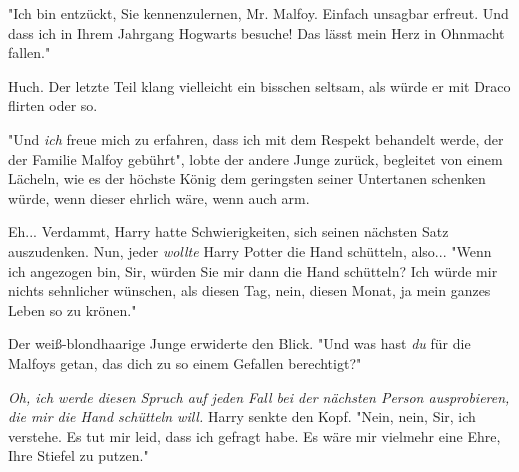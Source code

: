 "Ich bin entzückt, Sie kennenzulernen, Mr. Malfoy. Einfach unsagbar erfreut. Und dass ich in Ihrem Jahrgang Hogwarts besuche! Das lässt mein Herz in Ohnmacht fallen."

Huch. Der letzte Teil klang vielleicht ein bisschen seltsam, als würde er mit Draco flirten oder so. 

"Und \emph{ich} freue mich zu erfahren, dass ich mit dem Respekt behandelt werde, der der Familie Malfoy gebührt",
lobte der andere Junge zurück, begleitet von einem Lächeln, wie es der höchste König dem geringsten seiner Untertanen schenken würde, wenn dieser ehrlich wäre, wenn auch arm. 

Eh... Verdammt, Harry hatte Schwierigkeiten, sich seinen nächsten Satz auszudenken. Nun, jeder \emph{wollte} Harry Potter die Hand schütteln, also... "Wenn ich angezogen bin, Sir, würden Sie mir dann die Hand schütteln? Ich würde mir nichts sehnlicher wünschen, als diesen Tag, nein, diesen Monat, ja mein ganzes Leben so zu krönen." 

Der weiß-blondhaarige Junge erwiderte den Blick. "Und was hast \emph{du} für die Malfoys getan, das dich zu so einem Gefallen berechtigt?"

\emph{Oh, ich werde diesen Spruch auf jeden Fall bei der nächsten Person ausprobieren, die mir die Hand schütteln will.} Harry senkte den Kopf. "Nein, nein, Sir, ich verstehe. Es tut mir leid, dass ich gefragt habe. Es wäre mir vielmehr eine Ehre, Ihre Stiefel zu putzen." 

